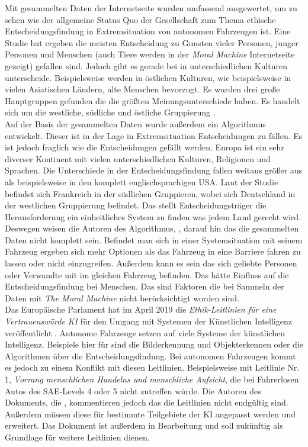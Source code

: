 Mit gesammelten Daten der Internetseite wurden umfassend ausgewertet, um zu sehen wie der allgemeine Status Quo der Gesellschaft zum Thema ethische Entscheidungsfindung in Extremsituation von autonomen Fahrzeugen ist. Eine Studie hat ergeben die meisten Entscheidung zu Gunsten vieler Personen, junger Personen und Menschen (auch Tiere werden in der \textit{Moral Machine} Internetseite gezeigt) gefallen sind. Jedoch gibt es gerade bei in unterschiedlichen Kulturen unterscheide. Beispielsweise werden in östlichen Kulturen, wie beispielsweise in vielen Asiatischen Ländern, alte Menschen bevorzugt. Es wurden drei große Hauptgruppen gefunden die die größten Meinungsunterschiede haben. Es handelt sich um die westliche, südliche und östliche Gruppierung \cite{moralMachine}.\\

Auf der Basis der gesammelten Daten wurde außerdem ein Algorithmus \cite{votingBasedSystem} entwickelt. Dieser ist in der Lage in Extremsituation Entscheidungen zu fällen. Es ist jedoch fraglich wie die Entscheidungen gefällt werden. Europa ist ein sehr diverser Kontinent mit vielen unterschiedlichen Kulturen, Religionen und Sprachen. Die Unterschiede in der Entscheidungsfindung fallen weitaus größer aus als beispielsweise in den komplett englischsprachigen USA. Laut der Studie befindet sich Frankreich in der südlichen Gruppieren, wobei sich Deutschland in der westlichen Gruppierung befindet. Das stellt Entscheidungsträger die Herausforderung ein einheitliches System zu finden was jedem Land gerecht wird.\\

Deswegen weisen die Autoren des Algorithmus, \citeauthor{votingBasedSystem}, darauf hin das die gesammelten Daten nicht komplett sein. Befindet man sich in einer Systemsituation mit seinem Fahrzeug ergeben sich mehr Optionen als das Fahrzeug in eine Barriere fahren zu lassen oder nicht einzugreifen. Außerdem kann es sein das sich geliebte Personen oder Verwandte mit im gleichen Fahrzeug befinden. Das hätte Einfluss auf die Entscheidungsfindung bei Menschen. Das sind Faktoren die bei Sammeln der Daten mit \textit{The Moral Machine} nicht berücksichtigt worden sind.\\

Das Europäische Parlament hat im April 2019 die \textit{Ethik-Leitlinien für eine Vertrauenswürde KI} für den Umgang mit Systemen der Künstlichen Intelligenz veröffentlicht \cite{ec2019ethics}. Autonome Fahrzeuge setzen auf viele Systeme der künstlichen Intelligenz. Beispiele hier für sind die Bilderkennung und Objekterkennen oder die Algorithmen über die Entscheidungsfindung. Bei autonomen Fahrzeugen kommt es jedoch zu einem Konflikt mit diesen Leitlinien. Beispielsweise mit Leitlinie Nr. 1, \textit{Vorrang menschlichen Handelns und menschliche Aufsicht}, die bei Fahrerlosen Autos des SAE-Levels 4 oder 5 nicht zutreffen würde. Die Autoren des Dokuments, die \citeauthor{ec2019ethics}, kommentieren jedoch das die Leitlinien nicht endgültig sind. Außerdem müssen diese für bestimmte Teilgebiete der KI angepasst werden und erweitert. Das Dokument ist außerdem in Bearbeitung und soll zukünftig als Grundlage für weitere Leitlinien dienen.\\